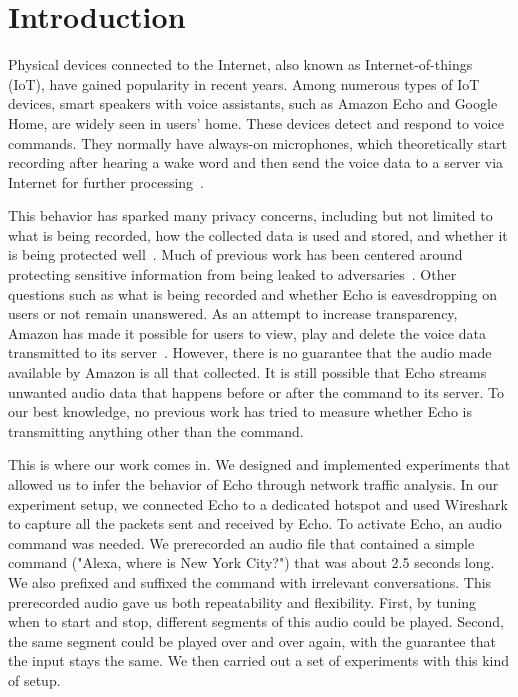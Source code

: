 \section{Introduction}
Physical devices connected to the Internet, also known as Internet-of-things (IoT), have gained popularity in recent years. Among numerous types of IoT devices, smart speakers with voice assistants, such as Amazon Echo and Google Home, are widely seen in users' home. These devices detect and respond to voice commands. They normally have always-on microphones, which theoretically start recording after hearing a wake word and then send the voice data to a server via Internet for further processing~\cite{AmazonEc68:online}.

This behavior has sparked many privacy concerns, including but not limited to what is being recorded, how the collected data is used and stored, and whether it is being protected well~\cite{lau2018alexa, fowler_2019, apthorpe2017smart, apthorpe2019keeping, apthorpe2017spying}. Much of previous work has been centered around protecting sensitive information from being leaked to adversaries~\cite{apthorpe2017smart, apthorpe2019keeping, apthorpe2017spying}. Other questions such as what is being recorded and whether Echo is eavesdropping on users or not remain unanswered. As an attempt to increase transparency, Amazon has made it possible for users to view, play and delete the voice data transmitted to its server~\cite{ford2019alexa}. However, there is no guarantee that the audio made available by Amazon is all that collected. It is still possible that Echo streams unwanted audio data that happens before or after the command to its server. To our best knowledge, no previous work has tried to measure whether Echo is transmitting anything other than the command.

This is where our work comes in. We designed and implemented experiments that allowed us to infer the behavior of Echo through network traffic analysis. In our experiment setup, we connected Echo to a dedicated hotspot and used Wireshark to capture all the packets sent and received by Echo. To activate Echo, an audio command was needed. We prerecorded an audio file that contained a simple command ("Alexa, where is New York City?") that was about 2.5 seconds long. We also prefixed and suffixed the command with irrelevant conversations. This prerecorded audio gave us both repeatability and flexibility. First, by tuning when to start and stop, different segments of this audio could be played. Second, the same segment could be played over and over again, with the guarantee that the input stays the same. We then carried out a set of experiments with this kind of setup.

